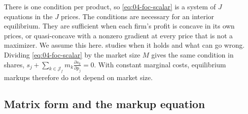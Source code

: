 There is one condition per product, so \eqref{eq:04-foc-scalar} is a system of $J$ equations in the $J$ prices.
The conditions are necessary for an interior equilibrium. They are sufficient when each firm's profit is concave
in its own prices, or quasi-concave with a nonzero gradient at every price that is not a maximizer. We assume this
here.  studies when it holds
and what can go wrong. Dividing \eqref{eq:04-foc-scalar} by the market size $M$ gives the same condition in
shares, $s_j + \sum_{k \in \mathcal{J}_f}m_k\frac{\partial s_k}{\partial p_j} = 0$. With constant marginal costs,
equilibrium markups therefore do not depend on market size.

\subsection{Matrix form and the markup equation}\label{sec:04-bertrand-matrix}

